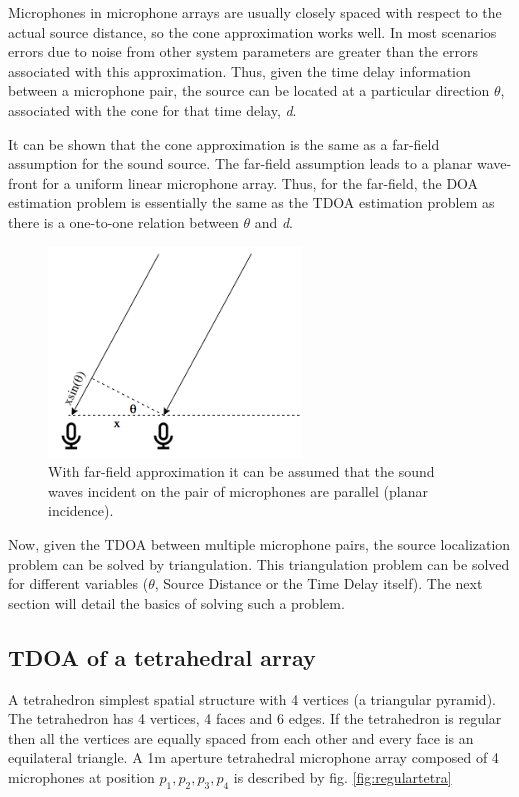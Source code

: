 Microphones in microphone arrays are usually closely spaced with respect to the actual source distance, so the cone approximation works well. In most scenarios errors due to noise from other system parameters are greater than the errors associated with this approximation. Thus, given the time delay information between a microphone pair, the source can be located at a particular direction $\theta$, associated with the cone for that time delay, \textit{d}. 

It can be shown that the cone approximation is the same as a far-field assumption for the sound source. The far-field assumption leads to a planar wave-front for a uniform linear microphone array. Thus, for the far-field, the DOA estimation problem is essentially the same as the TDOA estimation problem as there is a one-to-one relation between $\theta$ and \textit{d}.

\begin{figure}
    \centering
    \includegraphics[width=0.6\textwidth]{Figures/Far-field.png}
    \caption{With far-field approximation it can be assumed that the sound waves incident on the pair of microphones are parallel (planar incidence).}
    \label{fig:my_label}
\end{figure}

Now, given the TDOA between multiple microphone pairs, the source localization problem can be solved by triangulation. This triangulation problem can be solved for different variables ($\theta$, Source Distance or the Time Delay itself). The next section will detail the basics of solving such a problem. 

\subsection{TDOA of a tetrahedral array}\label{sec:TDOAN}

A tetrahedron simplest spatial structure with 4 vertices (a triangular pyramid). The tetrahedron has 4 vertices, 4 faces and 6 edges. If the tetrahedron is regular then all the vertices are equally spaced from each other and every face is an equilateral triangle. A 1m aperture tetrahedral microphone array composed of 4 microphones at position $p_1, p_2, p_3, p_4$ is described by fig. \ref{fig:regulartetra}


